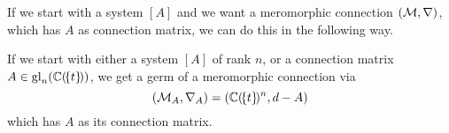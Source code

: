 
If we start with a system $[A]$ and we want a meromorphic connection
$(\mathcal{M},\nabla)$, which has $A$ as connection matrix, we can do this in the
following way.
\begin{prop}\label{prop:systToMeromConn}
  If we start with either a system $[A]$ of rank $n$, or a connection matrix
  $A\in\operatorname{gl}_n(\mathbb{C}(\!\{t\}\!))$, we get a germ of a meromorphic connection via
  \[
    (\mathcal{M}_A,\nabla_A)=(\mathbb{C}(\!\{t\}\!)^n,d-A)
  \]
  which has $A$ as its connection matrix.
\end{prop}
\begin{comment}
  \begin{proof}
    \TODO{}
  \end{proof}
\end{comment}

